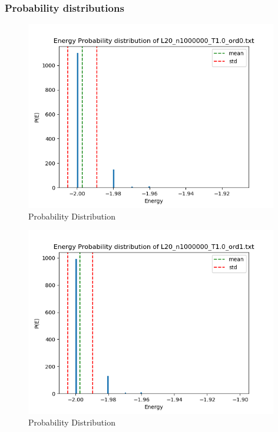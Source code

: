 \documentclass{article}
\begin{document}
\subsubsection{Probability distributions}


\begin{figure}[ht]
    \centering
    \includegraphics[width = 11cm]{img/energyhistogram_L20_n1000000_T10_ord0.png}
    \caption{Probability Distribution}
    \label{fig:prob-lowT-ord0}
  \end{figure}

\begin{figure}[ht]
    \centering
    \includegraphics[width = 11cm]{img/energyhistogram_L20_n1000000_T10_ord1.png}
    \caption{Probability Distribution}
    \label{fig:prob-lowT-ord1}
  \end{figure}
\end{document}
